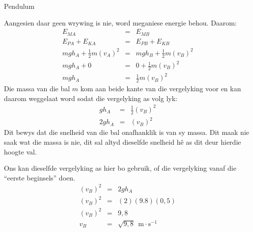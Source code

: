 \begin{wex}{Pendulum}
{
Aangesien daar geen wrywing is nie, word meganiese energie behou. Daarom:
\begin{eqnarray*}
E_{MA} &=& E_{MB}\\
E_{PA} + E_{KA} &=& E_{PB} + E_{KB}\\
mgh_A + \frac{1}{2}m(v_A)^2 &=& mgh_B + \frac{1}{2}m(v_B)^2\\
mgh_A + 0 &=& 0 + \frac{1}{2}m(v_B)^2\\
mgh_A &=& \frac{1}{2}m(v_B)^2
\end{eqnarray*}
Die massa van die bal $m$ kom aan beide kante van die vergelyking voor en kan daarom weggelaat word sodat die vergelyking as volg lyk:
\begin{eqnarray*}
gh_A &=& \frac{1}{2}(v_B)^2 \\
2gh_A &=& (v_B)^2
\end{eqnarray*}
Dit bewys dat die snelheid van die bal onafhanklik is van sy massa. Dit maak nie saak wat die massa is nie, dit sal altyd dieselfde snelheid hê as dit deur hierdie hoogte val.

Ons kan dieselfde vergelyking as hier bo gebruik, of die vergelyking vanaf die “eerste beginsels” doen.
\begin{eqnarray*}
(v_B)^2 &=& 2gh_A\\
(v_B)^2 &=& (2)(9.8)(0,5)\\
(v_B)^2 &=& 9,8\\
v_B &=& \sqrt{9,8}~ \ \text{m} \cdot \text{s}^{-1}
\end{eqnarray*}}
\end{wex}
    \noindent

